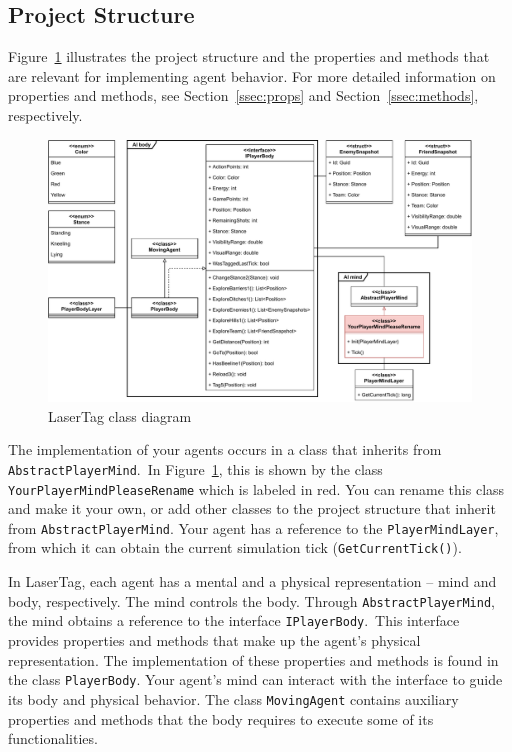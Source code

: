 \documentclass[
  a4paper,
  english,
  DIV=16,
  11pt,
  parskip=half,
  dvipsnames,
  listof=totoc,		     %
  index=totoc,		     %
  bibliography=totoc,	 %
]{scrartcl}
\begin{document}
\subsection{Project Structure} \label{ssec:projStruc}
%
Figure~\ref{fig:classdiag} illustrates the project structure and the properties and methods that are relevant for implementing agent behavior. For more detailed information on properties and methods, see Section~\ref{ssec:props} and Section~\ref{ssec:methods}, respectively.
%
\begin{figure}[H]
  \centering
  \includegraphics[width=1.0\textwidth,height=0.5\textheight,keepaspectratio]{img/LaserTagStructure.pdf}
  \caption{LaserTag class diagram}
  \label{fig:classdiag}
\end{figure}
%
The implementation of your agents occurs in a class that inherits from \texttt{AbstractPlayerMind}.~In Figure~\ref{fig:classdiag}, this is shown by the class \texttt{YourPlayerMindPleaseRename} which is labeled in red. You can rename this class and make it your own, or add other classes to the project structure that inherit from \texttt{AbstractPlayerMind}. Your agent has a reference to the \texttt{PlayerMindLayer}, from which it can obtain the current simulation tick (\texttt{GetCurrentTick()}).

In LaserTag, each agent has a mental and a physical representation -- mind and body, respectively. The mind controls the body. Through \texttt{AbstractPlayerMind}, the mind obtains a reference to the interface \texttt{IPlayerBody}.~This interface provides properties and methods that make up the agent's physical representation. The implementation of these properties and methods is found in the class \texttt{PlayerBody}. Your agent's mind can interact with the interface to guide its body and physical behavior. The class \texttt{MovingAgent} contains auxiliary properties and methods that the body requires to execute some of its functionalities.
\end{document}
